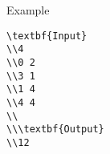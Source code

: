 Example
\begin{verbatim}
\textbf{Input}
\\4 
\\0 2 
\\3 1 
\\1 4 
\\4 4 
\\
\\\textbf{Output}
\\12\end{verbatim}